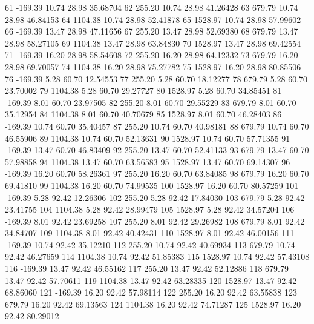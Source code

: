 \begin{Schunk}
\begin{Soutput}
61  -169.39     10.74  28.98 35.68704
62   255.20     10.74  28.98 41.26428
63   679.79     10.74  28.98 46.84153
64  1104.38     10.74  28.98 52.41878
65  1528.97     10.74  28.98 57.99602
66  -169.39     13.47  28.98 47.11656
67   255.20     13.47  28.98 52.69380
68   679.79     13.47  28.98 58.27105
69  1104.38     13.47  28.98 63.84830
70  1528.97     13.47  28.98 69.42554
71  -169.39     16.20  28.98 58.54608
72   255.20     16.20  28.98 64.12332
73   679.79     16.20  28.98 69.70057
74  1104.38     16.20  28.98 75.27782
75  1528.97     16.20  28.98 80.85506
76  -169.39      5.28  60.70 12.54553
77   255.20      5.28  60.70 18.12277
78   679.79      5.28  60.70 23.70002
79  1104.38      5.28  60.70 29.27727
80  1528.97      5.28  60.70 34.85451
81  -169.39      8.01  60.70 23.97505
82   255.20      8.01  60.70 29.55229
83   679.79      8.01  60.70 35.12954
84  1104.38      8.01  60.70 40.70679
85  1528.97      8.01  60.70 46.28403
86  -169.39     10.74  60.70 35.40457
87   255.20     10.74  60.70 40.98181
88   679.79     10.74  60.70 46.55906
89  1104.38     10.74  60.70 52.13631
90  1528.97     10.74  60.70 57.71355
91  -169.39     13.47  60.70 46.83409
92   255.20     13.47  60.70 52.41133
93   679.79     13.47  60.70 57.98858
94  1104.38     13.47  60.70 63.56583
95  1528.97     13.47  60.70 69.14307
96  -169.39     16.20  60.70 58.26361
97   255.20     16.20  60.70 63.84085
98   679.79     16.20  60.70 69.41810
99  1104.38     16.20  60.70 74.99535
100 1528.97     16.20  60.70 80.57259
101 -169.39      5.28  92.42 12.26306
102  255.20      5.28  92.42 17.84030
103  679.79      5.28  92.42 23.41755
104 1104.38      5.28  92.42 28.99479
105 1528.97      5.28  92.42 34.57204
106 -169.39      8.01  92.42 23.69258
107  255.20      8.01  92.42 29.26982
108  679.79      8.01  92.42 34.84707
109 1104.38      8.01  92.42 40.42431
110 1528.97      8.01  92.42 46.00156
111 -169.39     10.74  92.42 35.12210
112  255.20     10.74  92.42 40.69934
113  679.79     10.74  92.42 46.27659
114 1104.38     10.74  92.42 51.85383
115 1528.97     10.74  92.42 57.43108
116 -169.39     13.47  92.42 46.55162
117  255.20     13.47  92.42 52.12886
118  679.79     13.47  92.42 57.70611
119 1104.38     13.47  92.42 63.28335
120 1528.97     13.47  92.42 68.86060
121 -169.39     16.20  92.42 57.98114
122  255.20     16.20  92.42 63.55838
123  679.79     16.20  92.42 69.13563
124 1104.38     16.20  92.42 74.71287
125 1528.97     16.20  92.42 80.29012
\end{Soutput}
\end{Schunk}
